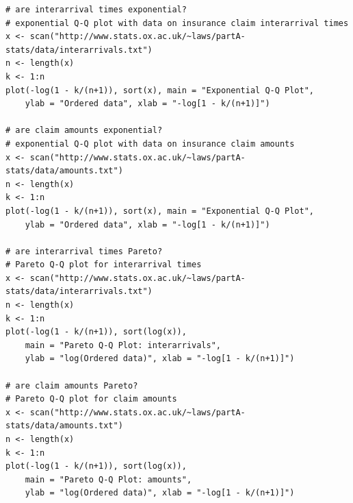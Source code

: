 \documentclass[answers]{exam}
\begin{document}
\begin{verbatim}
# are interarrival times exponential?
# exponential Q-Q plot with data on insurance claim interarrival times
x <- scan("http://www.stats.ox.ac.uk/~laws/partA-stats/data/interarrivals.txt")
n <- length(x)
k <- 1:n
plot(-log(1 - k/(n+1)), sort(x), main = "Exponential Q-Q Plot",
    ylab = "Ordered data", xlab = "-log[1 - k/(n+1)]")

# are claim amounts exponential?
# exponential Q-Q plot with data on insurance claim amounts
x <- scan("http://www.stats.ox.ac.uk/~laws/partA-stats/data/amounts.txt")
n <- length(x)
k <- 1:n
plot(-log(1 - k/(n+1)), sort(x), main = "Exponential Q-Q Plot",
    ylab = "Ordered data", xlab = "-log[1 - k/(n+1)]")

# are interarrival times Pareto?
# Pareto Q-Q plot for interarrival times
x <- scan("http://www.stats.ox.ac.uk/~laws/partA-stats/data/interarrivals.txt")
n <- length(x)
k <- 1:n
plot(-log(1 - k/(n+1)), sort(log(x)),
    main = "Pareto Q-Q Plot: interarrivals",
    ylab = "log(Ordered data)", xlab = "-log[1 - k/(n+1)]")

# are claim amounts Pareto?
# Pareto Q-Q plot for claim amounts
x <- scan("http://www.stats.ox.ac.uk/~laws/partA-stats/data/amounts.txt")
n <- length(x)
k <- 1:n
plot(-log(1 - k/(n+1)), sort(log(x)),
    main = "Pareto Q-Q Plot: amounts",
    ylab = "log(Ordered data)", xlab = "-log[1 - k/(n+1)]")
\end{verbatim}
\end{document}
